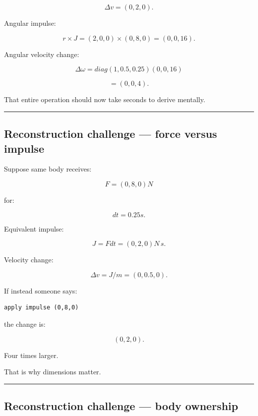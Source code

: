 \[
\Delta v
=
(0,2,0).
\]

Angular impulse:

\[
r\times J
=
(2,0,0)
\times
(0,8,0)
=
(0,0,16).
\]

Angular velocity change:

\[
\Delta\omega
=
diag(1,0.5,0.25)
(0,0,16)
\]

\[
=
(0,0,4).
\]

That entire operation should now take seconds to derive mentally.

\begin{center}\rule{0.5\linewidth}{0.5pt}\end{center}

\subsection{Reconstruction challenge --- force versus impulse}\label{06-engine-ii-ch038-reconstruction-challenge-force-versus-impulse}

\hypertarget{06-engine-ii-ch038-reconstruction-challenge-force-versus-impulse}{}

Suppose same body receives:

\[
F=(0,8,0)N
\]

for:

\[
dt=0.25s.
\]

Equivalent impulse:

\[
J=Fdt
=
(0,2,0)N\,s.
\]

Velocity change:

\[
\Delta v
=
J/m
=
(0,0.5,0).
\]

If instead someone says:

\begin{verbatim}
apply impulse (0,8,0)
\end{verbatim}

the change is:

\[
(0,2,0).
\]

Four times larger.

That is why dimensions matter.

\begin{center}\rule{0.5\linewidth}{0.5pt}\end{center}

\subsection{Reconstruction challenge --- body ownership}\label{06-engine-ii-ch038-reconstruction-challenge-body-ownership}


